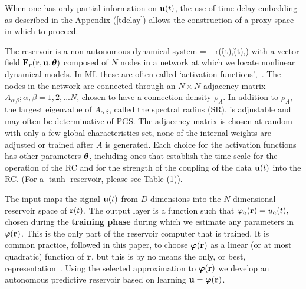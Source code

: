 \documentclass[12pt]{article}
\begin{document}
When one has only partial information on $\mbox{$\bf{u}$}(t)$, the use of time delay embedding as described in the Appendix (\ref{tdelay}) allows the construction of a proxy space~\cite{abar96,kantz04} in which to proceed.

The reservoir is a non-autonomous dynamical system \be {} = \F_r(\r(t),\u(t),\btheta) \ee with a vector field $\mbox{$\bf{F}$}_r(\mbox{{\bf r}},\mbox{$\bf{u}$},\mbox{$\boldsymbol{\theta}$})$ composed of $N$ nodes in a network at which we locate nonlinear dynamical models. In ML these are often called `activation functions',~\cite{Wojcik04, Brunner16, Chrisantha03,Haynes14,Larger17,Paquot11}.  The nodes in the network are connected through an $N \times N$ adjacency matrix $A_{\alpha\,\beta}; \alpha,\beta = 1,2,...N$, chosen to have a connection density $\rho_{A}$. In addition to $\rho_A$, the largest eigenvalue of $A_{\alpha\,\beta}$, called the spectral radius (SR), is adjustable and may often be determinative of PGS.  The adjacency matrix is chosen at random with only a few global characteristics set, none of the internal weights are adjusted or trained after $A$ is generated.  Each choice for the activation functions has other parameters $\mbox{$\boldsymbol{\theta}$}$, including ones that establish the time scale for the operation of the RC and for the strength of the coupling of the data $\mbox{$\bf{u}$}(t)$ into the RC. (For a $\tanh$ reservoir, please see Table (1)).

The input maps the signal $\mbox{$\bf{u}$}(t)$ from $D$ dimensions into the $N$ dimensional reservoir space of $\mbox{{\bf r}}(t)$.  The output layer is a function such that $\varphi_a(\mbox{{\bf r}})= u_a(t),$ chosen during the {\bf training phase} during which we estimate any parameters in $\varphi(\mbox{{\bf r}})$. This is the only part of the reservoir computer that is trained.   It is common practice, followed in this paper, to choose $\mbox{$\boldsymbol{\varphi}$}(\mbox{{\bf r}})$ as a linear (or at most quadratic) function of $\mbox{{\bf r}}$, but this is by no means the only, or best, representation~\cite{silverman86,buhmann09,casdagli89,billings13,broom88,guill98, Scott05}. Using the selected approximation to $\mbox{$\boldsymbol{\varphi}$}(\mbox{{\bf r}})$ we develop an autonomous predictive reservoir based on learning $\mbox{$\bf{u}$} = \mbox{$\boldsymbol{\varphi}$}(\mbox{{\bf r}})$.

\end{document}
